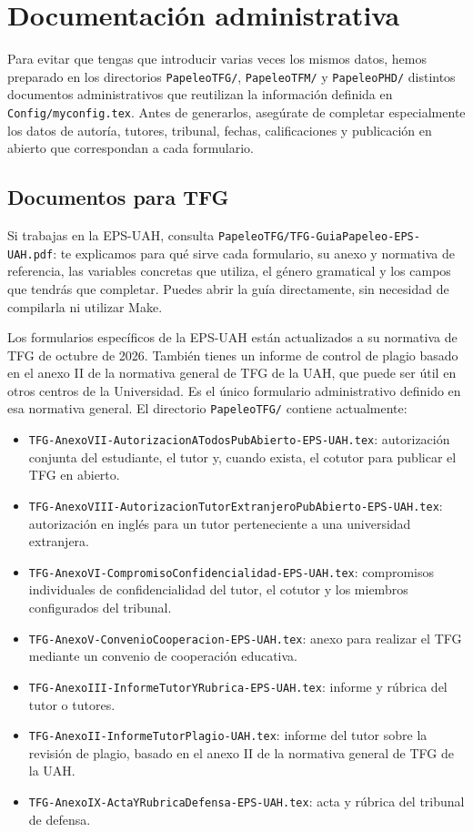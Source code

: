 \section{Documentación administrativa}
\label{sec:introapp1}

Para evitar que tengas que introducir varias veces los mismos datos, hemos preparado en los directorios \texttt{PapeleoTFG/}, \texttt{PapeleoTFM/} y \texttt{PapeleoPHD/} distintos documentos administrativos que reutilizan la información definida en \texttt{Config/myconfig.tex}. Antes de generarlos, asegúrate de completar especialmente los datos de autoría, tutores, tribunal, fechas, calificaciones y publicación en abierto que correspondan a cada formulario.

\subsection{Documentos para TFG}

Si trabajas en la EPS-UAH, consulta \texttt{PapeleoTFG/TFG-GuiaPapeleo-EPS-UAH.pdf}: te explicamos para qué sirve cada formulario, su anexo y normativa de referencia, las variables concretas que utiliza, el género gramatical y los campos que tendrás que completar. Puedes abrir la guía directamente, sin necesidad de compilarla ni utilizar Make.

Los formularios específicos de la EPS-UAH están actualizados a su normativa de TFG de octubre de 2026. También tienes un informe de control de plagio basado en el anexo II de la normativa general de TFG de la UAH, que puede ser útil en otros centros de la Universidad. Es el único formulario administrativo definido en esa normativa general. El directorio \texttt{PapeleoTFG/} contiene actualmente:

\begin{itemize}
  \item \texttt{TFG-AnexoVII-AutorizacionATodosPubAbierto-EPS-UAH.tex}: autorización conjunta del estudiante, el tutor y, cuando exista, el cotutor para publicar el TFG en abierto.
  \item \texttt{TFG-AnexoVIII-AutorizacionTutorExtranjeroPubAbierto-EPS-UAH.tex}: autorización en inglés para un tutor perteneciente a una universidad extranjera.
  \item \texttt{TFG-AnexoVI-CompromisoConfidencialidad-EPS-UAH.tex}: compromisos individuales de confidencialidad del tutor, el cotutor y los miembros configurados del tribunal.
  \item \texttt{TFG-AnexoV-ConvenioCooperacion-EPS-UAH.tex}: anexo para realizar el TFG mediante un convenio de cooperación educativa.
  \item \texttt{TFG-AnexoIII-InformeTutorYRubrica-EPS-UAH.tex}: informe y rúbrica del tutor o tutores.
  \item \texttt{TFG-AnexoII-InformeTutorPlagio-UAH.tex}: informe del tutor sobre la revisión de plagio, basado en el anexo II de la normativa general de TFG de la UAH.
  \item \texttt{TFG-AnexoIX-ActaYRubricaDefensa-EPS-UAH.tex}: acta y rúbrica del tribunal de defensa.
\end{itemize}

